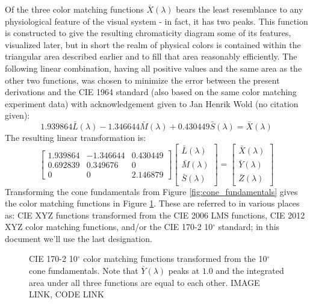 \documentclass[twocolumn]{article}
\newif\ifinvert
\begin{document}
Of the three color matching functions $\bar{X}(\lambda)$ bears the least resemblance to any physiological feature of the visual system - in fact, it has two peaks.  This function is constructed to give the resulting chromaticity diagram some of its features, visualized later, but in short the realm of physical colors is contained within the triangular area described earlier and to fill that area reasonably efficiently.  The following linear combination, having all positive values and the same area as the other two functions, was chosen to minimize the error between the present derivations and the CIE 1964 standard (also based on the same color matching experiment data) with acknowledgement given to Jan Henrik Wold (no citation given):
\begin{equation}
    1.939864\bar{L}(\lambda)-1.346644\bar{M}(\lambda)+0.430449\bar{S}(\lambda)=\bar{X}(\lambda)
\end{equation}
The resulting linear transformation is:
\begin{equation}\label{eq:lms_to_xyz_10}
    \begin{bmatrix}
        1.939864&-1.346644&0.430449\\
        0.692839&0.349676&0\\
        0&0&2.146879
    \end{bmatrix}\begin{bmatrix}
        \bar{L}(\lambda)\\
        \bar{M}(\lambda)\\
        \bar{S}(\lambda)
    \end{bmatrix}=\begin{bmatrix}
        \bar{X}(\lambda)\\
        \bar{Y}(\lambda)\\
        \bar{Z}(\lambda)
    \end{bmatrix}
\end{equation}
Transforming the cone fundamentals from Figure \ref{fig:cone_fundamentals} gives the color matching functions in Figure \ref{fig:color_matching_functions}.  These are referred to in various places as: CIE XYZ functions transformed from the CIE 2006 LMS functions, CIE 2012 XYZ color matching functions, and/or the CIE 170-2 10$^\circ$ standard; in this document we'll use the last designation.
\begin{figure}[h]
    \ifinvert
        
    \else
        
    \fi
    \caption{CIE 170-2 10$^\circ$ color matching functions transformed from the 10$^\circ$ cone fundamentals.  Note that $\bar{Y}(\lambda)$ peaks at $1.0$ and the integrated area under all three functions are equal to each other. IMAGE LINK, CODE LINK}\label{fig:color_matching_functions}
\end{figure}
\end{document}
